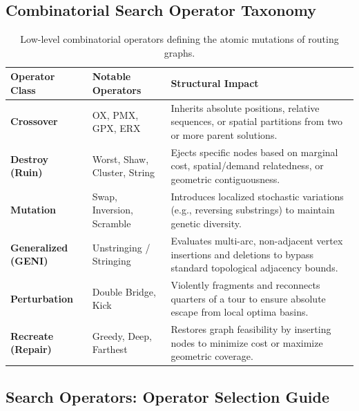 \documentclass{article}
\begin{document}

\subsection*{Combinatorial Search Operator Taxonomy}

\begin{table}[H]
    \centering
    \caption{Low-level combinatorial operators defining the atomic mutations of routing graphs.}
    \begin{tabularx}{\textwidth}{@{} l l X @{}}
        \toprule
        \textbf{Operator Class} & \textbf{Notable Operators} & \textbf{Structural Impact} \\
        \midrule
        \textbf{Crossover} & OX, PMX, GPX, ERX & Inherits absolute positions, relative sequences, or spatial partitions from two or more parent solutions. \\
        \textbf{Destroy (Ruin)} & Worst, Shaw, Cluster, String & Ejects specific nodes based on marginal cost, spatial/demand relatedness, or geometric contiguousness. \\
        \textbf{Mutation} & Swap, Inversion, Scramble & Introduces localized stochastic variations (e.g., reversing substrings) to maintain genetic diversity. \\
        \textbf{Generalized (GENI)} & Unstringing / Stringing & Evaluates multi-arc, non-adjacent vertex insertions and deletions to bypass standard topological adjacency bounds. \\
        \textbf{Perturbation} & Double Bridge, Kick & Violently fragments and reconnects quarters of a tour to ensure absolute escape from local optima basins. \\
        \textbf{Recreate (Repair)} & Greedy, Deep, Farthest & Restores graph feasibility by inserting nodes to minimize cost or maximize geometric coverage. \\
        \bottomrule
    \end{tabularx}
\end{table}

\subsection*{Search Operators: Operator Selection Guide}
\end{document}
